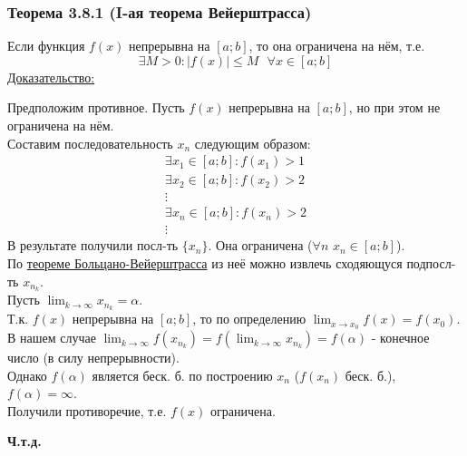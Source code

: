 \documentclass[12pt]{article}
\def\posl#1#2{\{#1_{#2}\}}
\begin{document}
    \subsubsection*{Теорема 3.8.1 (I-ая теорема Вейерштрасса)}\label{th:3.8.1}
    Если функция $f(x)$ непрерывна на $[a; b]$, то она ограничена на нём, т.е.
    \[ \exists M > 0 : \left|f(x)\right| \le M \text{ } \forall x \in [a; b] \]\noindent
    \underline{Доказательство:}
    \begin{adjustwidth}{1.5em}{1.5em}
        Предположим противное. Пусть $f(x)$ непрерывна на $[a; b]$, но при этом не ограничена на нём.\\
        Составим последовательность $x_n$ следующим образом:
            \begin{gather*}
                \exists x_1 \in [a; b] : f(x_1) > 1\\
                \exists x_2 \in [a; b] : f(x_2) > 2\\
                \vdots\\
                \exists x_n \in [a; b] : f(x_n) > 2\\
                \vdots
            \end{gather*}
        В результате получили посл-ть $\posl{x}{n}$. Она ограничена ($\forall n$ $x_n \in [a; b]$).\\
        По \hyperref[th:2.8.1]{теореме Больцано-Вейерштрасса} из неё можно извлечь сходяющуся подпосл-ть $x_{n_k}$.\\
        Пусть $\lim_{k\to\infty}x_{n_k} = \alpha$.\\
        Т.к. $f(x)$ непрерывна на $[a; b]$, то по определению $\lim_{x\to x_0} f(x) = f(x_0)$.\\
        В нашем случае $\lim_{k\to\infty} f(x_{n_k}) = f(\lim_{k\to\infty}x_{n_{k}}) = f(\alpha)$ - конечное число (в силу непрерывности).\\
        Однако $f(\alpha)$ является беск. б. по построению $x_n$ ($f(x_n)$ беск. б.), $f(\alpha) = \infty$.\\
        Получили противоречие, т.е. $f(x)$ ограничена.
        \begin{center}
            \textbf{Ч.т.д.}
        \end{center} 
    \end{adjustwidth}
\end{document}

